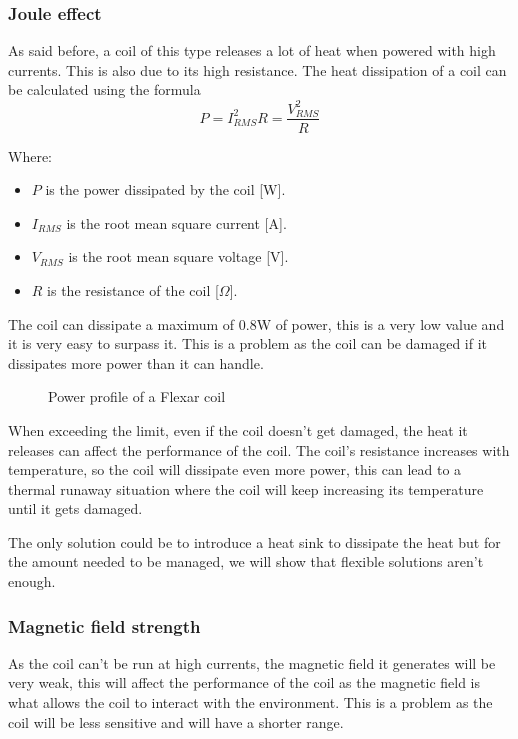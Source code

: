 \subsubsection{Joule effect}
\label{subsubsec: Joule_effect}
As said before, a coil of this type releases a lot of heat when powered with high currents. This is also due to its high resistance. The heat dissipation of a coil can be calculated using the formula
\begin{equation}
    P = I_{RMS}^2 R = \frac{V_{RMS}^2}{R}
\end{equation} 

Where:
\begin{itemize}
    \item \( P \) is the power dissipated by the coil [W].
    \item \( I_{RMS} \) is the root mean square current [A].
    \item \( V_{RMS} \) is the root mean square voltage [V].
    \item \( R \) is the resistance of the coil [\(\Omega\)].
\end{itemize}

The coil can dissipate a maximum of 0.8W of power, this is a very low value and it is very easy to surpass it. This is a problem as the coil can be damaged if it dissipates more power than it can handle.

\begin{figure}
    \centering
    \resizebox{0.5\textwidth}{!}{}
    \caption{Power profile of a Flexar coil}
    \label{fig: Flexar_power_profile}
\end{figure}

When exceeding the limit, even if the coil doesn't get damaged, the heat it releases can affect the performance of the coil. The coil's resistance increases with temperature, so the coil will dissipate even more power, this can lead to a thermal runaway situation where the coil will keep increasing its temperature until it gets damaged.

The only solution could be to introduce a heat sink to dissipate the heat but for the amount needed to be managed, we will show that flexible solutions aren't enough.

\subsubsection{Magnetic field strength}
As the coil can't be run at high currents, the magnetic field it generates will be very weak, this will affect the performance of the coil as the magnetic field is what allows the coil to interact with the environment. This is a problem as the coil will be less sensitive and will have a shorter range.

